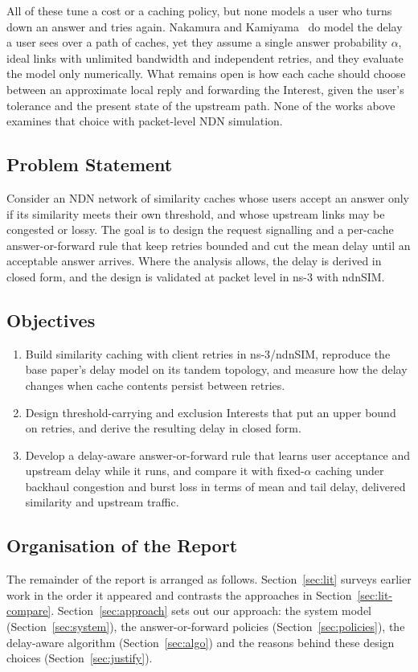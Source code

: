 \documentclass[11pt,a4paper]{article}
\begin{document}
All of these tune a cost or a caching policy, but none models a user who turns down an answer and
tries again. Nakamura and Kamiyama~\cite{nakamura2024analysis} do model the delay a user sees over a
path of caches, yet they assume a single answer probability $\alpha$, ideal links with unlimited
bandwidth and independent retries, and they evaluate the model only numerically. What remains open
is how each cache should choose between an approximate local reply and forwarding the Interest,
given the user's tolerance and the present state of the upstream path. None of the works above
examines that choice with packet-level NDN simulation.

\subsection{Problem Statement}
Consider an NDN network of similarity caches whose users accept an answer only if its similarity
meets their own threshold, and whose upstream links may be congested or lossy. The goal is to design
the request signalling and a per-cache answer-or-forward rule that keep retries bounded and cut the
mean delay until an acceptable answer arrives. Where the analysis allows, the delay is derived in
closed form, and the design is validated at packet level in ns-3 with ndnSIM.

\subsection{Objectives}
\begin{enumerate}[label=\textbf{O\arabic*.}]
  \item Build similarity caching with client retries in ns-3/ndnSIM, reproduce the base paper's
        delay model on its tandem topology, and measure how the delay changes when cache contents
        persist between retries.
  \item Design threshold-carrying and exclusion Interests that put an upper bound on retries, and
        derive the resulting delay in closed form.
  \item Develop a delay-aware answer-or-forward rule that learns user acceptance and upstream delay
        while it runs, and compare it with fixed-$\alpha$ caching under backhaul congestion and burst
        loss in terms of mean and tail delay, delivered similarity and upstream traffic.
\end{enumerate}

\subsection{Organisation of the Report}
The remainder of the report is arranged as follows. Section~\ref{sec:lit} surveys earlier work in
the order it appeared and contrasts the approaches in Section~\ref{sec:lit-compare}.
Section~\ref{sec:approach} sets out our approach: the system model (Section~\ref{sec:system}), the
answer-or-forward policies (Section~\ref{sec:policies}), the delay-aware algorithm
(Section~\ref{sec:algo}) and the reasons behind these design choices (Section~\ref{sec:justify}).
\end{document}
